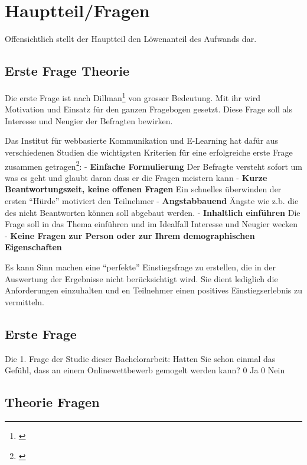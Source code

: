 \newpage

\section{Hauptteil/Fragen}\label{hauptteilfragen}

Offensichtlich stellt der Hauptteil den Löwenanteil des Aufwands dar.

\subsection{Erste Frage Theorie}\label{erste-frage-theorie}

Die erste Frage ist nach Dillman\footnote{\autocite{dillman}} von
grosser Bedeutung. Mit ihr wird Motivation und Einsatz für den ganzen
Fragebogen gesetzt. Diese Frage soll als Interesse und Neugier der
Befragten bewirken.

Das Institut für webbasierte Kommunikation und E-Learning hat dafür aus
verschiedenen Studien die wichtigsten Kriterien für eine erfolgreiche
erste Frage zusammen getragen\footnote{\autocite{fragebogen}}: -
\textbf{Einfache Formulierung} Der Befragte versteht sofort um was es
geht und glaubt daran dass er die Fragen meistern kann - \textbf{Kurze
Beantwortungszeit, keine offenen Fragen} Ein schnelles überwinden der
ersten ``Hürde'' motiviert den Teilnehmer - \textbf{Angstabbauend}
Ängste wie z.b. die des nicht Beantworten können soll abgebaut werden. -
\textbf{Inhaltlich einführen} Die Frage soll in das Thema einführen und
im Idealfall Interesse und Neugier wecken - \textbf{Keine Fragen zur
Person oder zur Ihrem demographischen Eigenschaften}

Es kann Sinn machen eine ``perfekte'' Einstiegsfrage zu erstellen, die
in der Auswertung der Ergebnisse nicht berücksichtigt wird. Sie dient
lediglich die Anforderungen einzuhalten und en Teilnehmer einen
positives Einstiegserlebnis zu vermitteln.

\subsection{Erste Frage}\label{erste-frage}

Die 1. Frage der Studie dieser Bachelorarbeit: Hatten Sie schon einmal
das Gefühl, dass an einem Onlinewettbewerb gemogelt werden kann? 0 Ja 0
Nein

\subsection{Theorie Fragen}\label{theorie-fragen}

